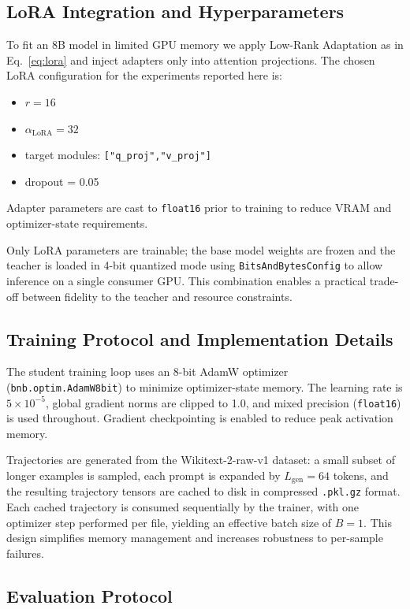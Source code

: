 \documentclass[11pt, a4paper]{article}
\begin{document}
\subsection{LoRA Integration and Hyperparameters}

To fit an 8B model in limited GPU memory we apply Low-Rank Adaptation as in
Eq.~\eqref{eq:lora} and inject adapters only into attention projections. The
chosen LoRA configuration for the experiments reported here is:
\begin{itemize}
    \item $r = 16$
    \item $\alpha_{\text{LoRA}} = 32$
    \item target modules: \texttt{["q\_proj","v\_proj"]}
    \item dropout = 0.05
\end{itemize}
Adapter parameters are cast to \texttt{float16} prior to training to reduce VRAM
and optimizer-state requirements.

Only LoRA parameters are trainable; the base model weights are frozen and the
teacher is loaded in 4-bit quantized mode using \texttt{BitsAndBytesConfig} to
allow inference on a single consumer GPU. This combination enables a practical
trade-off between fidelity to the teacher and resource constraints.

\subsection{Training Protocol and Implementation Details}

The student training loop uses an 8-bit AdamW optimizer (\texttt{bnb.optim.AdamW8bit})
to minimize optimizer-state memory. The learning rate is $5\times 10^{-5}$, global
gradient norms are clipped to 1.0, and mixed precision (\texttt{float16}) is
used throughout. Gradient checkpointing is enabled to reduce peak activation memory.

Trajectories are generated from the Wikitext-2-raw-v1 dataset: a small subset
of longer examples is sampled, each prompt is expanded by $L_{\text{gen}}=64$
tokens, and the resulting trajectory tensors are cached to disk in compressed
\texttt{.pkl.gz} format. Each cached trajectory is consumed sequentially by the trainer,
with one optimizer step performed per file, yielding an effective batch size of
$B=1$. This design simplifies memory management and increases robustness to
per-sample failures.

\subsection{Evaluation Protocol}
\end{document}
